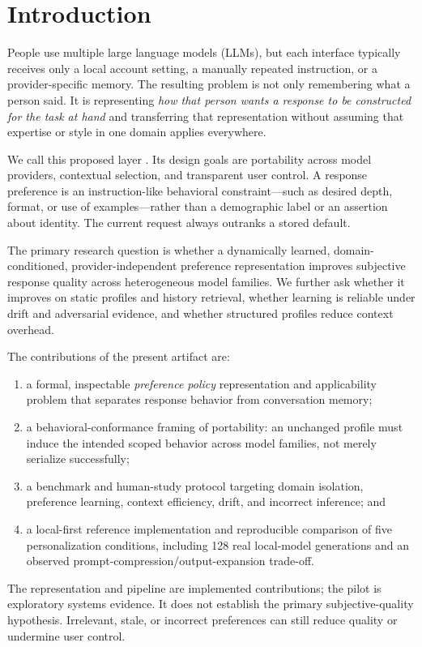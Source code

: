 \section{Introduction}
\label{sec:introduction}

People use multiple large language models (LLMs), but each interface typically
receives only a local account setting, a manually repeated instruction, or a
provider-specific memory. The resulting problem is not only remembering what a
person said. It is representing \emph{how that person wants a response to be
constructed for the task at hand} and transferring that representation without
assuming that expertise or style in one domain applies everywhere.

We call this proposed layer \systemname{}. Its design goals are portability across
model providers, contextual selection, and transparent user control. A response
preference is an instruction-like behavioral constraint---such as desired depth,
format, or use of examples---rather than a demographic label or an assertion
about identity. The current request always outranks a stored default.

The primary research question is whether a dynamically learned,
domain-conditioned, provider-independent preference representation improves
subjective response quality across heterogeneous model families. We further ask
whether it improves on static profiles and history retrieval, whether learning is
reliable under drift and adversarial evidence, and whether structured profiles
reduce context overhead.

The contributions of the present artifact are:
\begin{enumerate}[leftmargin=*]
  \item a formal, inspectable \emph{preference policy} representation and
  applicability problem that separates response behavior from conversation memory;
  \item a behavioral-conformance framing of portability: an unchanged profile
  must induce the intended scoped behavior across model families, not merely
  serialize successfully;
  \item a benchmark and human-study protocol targeting domain isolation,
  preference learning, context efficiency, drift, and incorrect inference; and
  \item a local-first reference implementation and reproducible comparison of five
  personalization conditions, including 128 real local-model generations and an
  observed prompt-compression/output-expansion trade-off.
\end{enumerate}

The representation and pipeline are implemented contributions; the pilot is
exploratory systems evidence. It does not establish the primary subjective-quality
hypothesis. Irrelevant, stale, or incorrect preferences can still reduce quality
or undermine user control.
